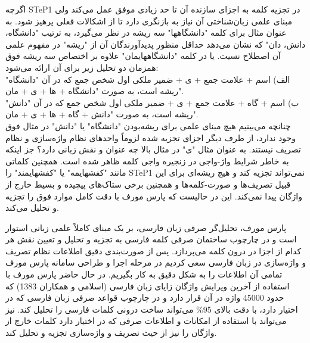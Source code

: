\documentclass[12pt,onecolumn,a4paper]{article}
\begin{document}
    اگرچه STeP1 در تجزیه کلمه به اجزای سازنده آن تا حد زیادی موفق عمل می‌کند ولی مبنای علمی زبان‌شناختی آن نیاز به بازنگری دارد تا از اشکالات فعلی پرهیز شود. به عنوان مثال برای کلمه "دانشگاهها" سه ریشه در نظر می‌گیرد، به ترتیب "دانشگاه، دانش، دان" که نشان می‌دهد حداقل منظور پدیدآورندگان آن از "ریشه" در مفهوم علمی آن اصطلاح نسیت. یا در کلمه "دانشگاههایمان" علاوه بر اختصاص سه ریشه فوق همزمان دو تحلیل زیر برای آن ارائه می‌شود:\\
    الف) اسم + علامت جمع + ی + ضمیر ملکی اول شخص جمع که در آن "دانشگاه" ریشه است، به صورت "دانشگاه + ها + ی + مان".\\
    ب) اسم + گاه + علامت جمع + ی + ضمیر ملکی اول شخص جمع که در آن "دانش" ریشه است، به صورت "دانش + گاه + ها + ی + مان".\\
    چنانچه می‌بینیم هیچ مبنای علمی برای ریشه‌بودن "دانشگاه" یا "دانش" در مثال فوق وجود ندارد، از طرف دیگر اجزای تجزیه شده لزوماً واحدهای نظام واژه‌سازی و نظام تصریف نیستند. به عنوان مثال "ی" در مثال بالا چه عنوان و نقش زبانی دارد؟ جز اینکه به خاطر شرایط واژ-واجی در زنجیره واجی کلمه ظاهر شده است. همچنین کلماتی مانند "کفشهایمه" یا "کفشهایمند" را STeP1 نمی‌تواند تجزیه کند و هیچ ریشه‌ای برای این قبیل تصریف‌ها و صورت-کلمه‌ها و همچنین برخی ستاک‌های پیچیده و بسیط خارج از واژگان پیدا نمی‌کند. این در حالیست که پارس مورف با دقت کامل موارد فوق را تجزیه و تحلیل می‌کند.
    \par\noindent
    پارس مورف، تحلیل‌گر صرفی زبان فارسی، بر یک مبنای کاملاً علمی زبانی استوار است و در چارچوب ساختمان صرفی کلمه فارسی به تجزیه و تحلیل و تعیین نقش هر کدام از اجزا در درون کلمه می‌پردازد. پس از صورت‌بندی دقیق اطلاعات نظام تصریف و واژه‌سازی در زبان فارسی سعی کردیم در مرحله اجرا و طراحی سامانه پارس مورف تمامی آن اطلاعات را به شکل دقیق به کار بگیریم. در حال حاضر پارس مورف با استفاده از آخرین ویرایش واژگان زایای زبان فارسی (اسلامی و همکاران 1383) که حدود 45000 واژه در آن قرار دارد و در چارچوب قواعد صرفی زبان فارسی که در اختیار دارد، با دقت بالای 95\% می‌تواند ساخت درونی کلمات فارسی را تحلیل کند. نیز می‌تواند با استفاده از امکانات و اطلاعات صرفی که در اختیار دارد کلمات خارج از واژگان را نیز از حیث تصریف و واژه‌سازی تجزیه و تحلیل کند.
    \par\noindent
\end{document}
